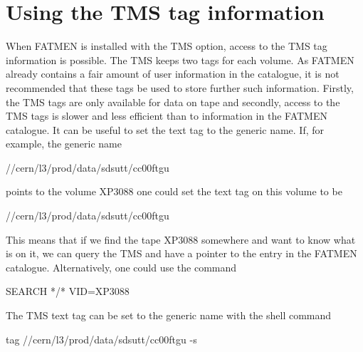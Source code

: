 \section{Using the TMS tag information}
\par
When FATMEN is installed with the TMS option, access to the TMS
tag information is possible. The TMS keeps two tags for each volume.
As FATMEN already contains a fair amount of user information in the
catalogue, it is not recommended that these tags be used to store
further such information. Firstly, the TMS tags are only available
for data on tape and secondly, access to the TMS tags is slower
and less efficient than to information in the FATMEN catalogue.
It can be useful to set the text tag to the generic name.
If, for example, the generic name 
\begin{XMP}
//cern/l3/prod/data/sdsutt/cc00ftgu
\end{XMP}
points to the volume XP3088 one could set the text tag on
this volume to be 
\begin{XMP}
//cern/l3/prod/data/sdsutt/cc00ftgu
\end{XMP}
This means that if we find the tape XP3088 somewhere and want to
know what is on it, we can query the TMS and have a pointer
to the entry in the FATMEN catalogue.
Alternatively, one could use the command
\begin{XMP}
SEARCH */* VID=XP3088
\end{XMP}
\par
The TMS text tag can be set to the generic name with the shell command
\begin{XMP}
tag //cern/l3/prod/data/sdsutt/cc00ftgu -s
\end{XMP}
